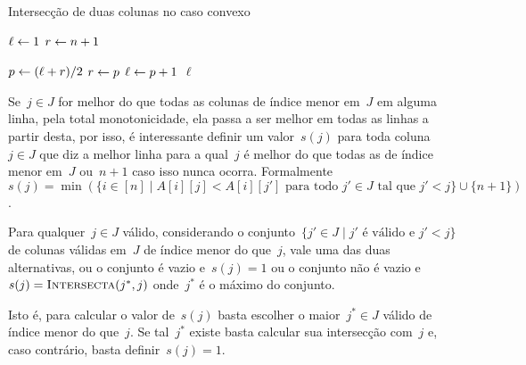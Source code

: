 \begin{algorithm}[h]
\caption{Intersecção de duas colunas no caso convexo}
\label{Online:convex:BB}
\begin{algorithmic}[1]
    \State $\ell \leftarrow 1$
    \State $r \leftarrow n+1$

        \State $p \leftarrow (\ell + r)/2$
         \label{Online:convex:BB:ineq}
            \State $r \leftarrow p$
        \Else
            \State $\ell \leftarrow p+1$
        \EndIf
    \EndWhile
    \State \Return $\ell$
\EndFunction
\end{algorithmic}
\end{algorithm}

Se~$j \in J$ for melhor do que todas as colunas de índice menor em~$J$ em alguma linha, pela total monotonicidade, ela passa a ser melhor em todas as linhas a partir desta, por isso, é interessante definir um valor~$s(j)$ para toda coluna~$j \in J$ que diz a melhor linha para a qual~$j$ é melhor do que todas as de índice menor em~$J$ ou~$n+1$ caso isso nunca ocorra.  Formalmente~${ s(j) = \min(\{i \in [n] \mid A[i][j] < A[i][j'] \text{ para todo } j' \in J \text{ tal que } j' < j\} \cup \{n+1\}) }$.

\begin{prop} \label{Online:convex:easys}
Para qualquer~$j \in J$ válido, considerando o conjunto~$\{j' \in J \mid j' \text{ é válido e } j' < j\}$ de colunas válidas em~$J$ de índice menor do que~$j$, vale uma das duas alternativas, ou o conjunto é vazio e~$s(j) = 1$ ou o conjunto não é vazio e~$s(j) = \textsc{Intersecta}(j^*,j)$ onde~$j^*$ é o máximo do conjunto.

Isto é, para calcular o valor de~$s(j)$ basta escolher o maior~$j^* \in J$ válido de índice menor do que~$j$. Se tal~$j^*$ existe basta calcular sua intersecção com~$j$ e, caso contrário, basta definir~$s(j) = 1$.
\end{prop}

